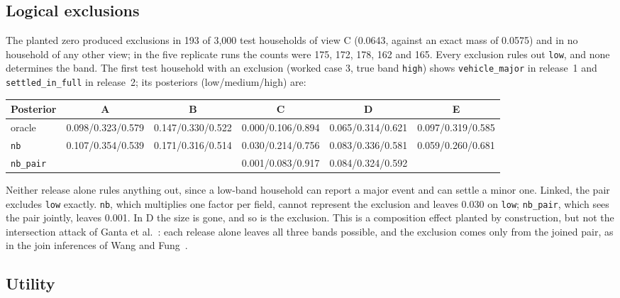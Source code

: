 \documentclass[11pt]{article}
\newcommand{\code}[1]{\texttt{#1}}
\begin{document}
\subsection{Logical exclusions}

The planted zero produced exclusions in 193 of 3,000 test households of view C (0.0643, against an exact mass of 0.0575) and in no household of any other view; in the five replicate runs the counts were 175, 172, 178, 162 and 165. Every exclusion rules out \code{low}, and none determines the band. The first test household with an exclusion (worked case 3, true band \code{high}) shows \code{vehicle\_major} in release~1 and \code{settled\_in\_full} in release~2; its posteriors (low/medium/high) are:

\begin{center}\footnotesize
\setlength{\tabcolsep}{4pt}
\begin{tabular}{@{}lccccc@{}}
\toprule
Posterior & A & B & C & D & E \\
\midrule
oracle & 0.098/0.323/0.579 & 0.147/0.330/0.522 & 0.000/0.106/0.894 & 0.065/0.314/0.621 & 0.097/0.319/0.585 \\
\code{nb} & 0.107/0.354/0.539 & 0.171/0.316/0.514 & 0.030/0.214/0.756 & 0.083/0.336/0.581 & 0.059/0.260/0.681 \\
\code{nb\_pair} & & & 0.001/0.083/0.917 & 0.084/0.324/0.592 & \\
\bottomrule
\end{tabular}
\end{center}

Neither release alone rules anything out, since a low-band household can report a major event and can settle a minor one. Linked, the pair excludes \code{low} exactly. \code{nb}, which multiplies one factor per field, cannot represent the exclusion and leaves 0.030 on \code{low}; \code{nb\_pair}, which sees the pair jointly, leaves 0.001. In D the size is gone, and so is the exclusion. This is a composition effect planted by construction, but not the intersection attack of Ganta et al.~\cite{ganta2008composition}: each release alone leaves all three bands possible, and the exclusion comes only from the joined pair, as in the join inferences of Wang and Fung~\cite{wang2006sequential}.

\subsection{Utility}
\end{document}
